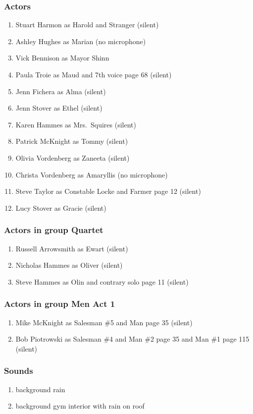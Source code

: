 \subsubsection{Actors}
\begin{enumerate}
\item Stuart Harmon as Harold and Stranger (silent)
\item Ashley Hughes as Marian (no microphone)
\item Vick Bennison as Mayor Shinn
\item Paula Troie as Maud and 7th voice page 68 (silent)
\item Jenn Fichera as Alma (silent)
\item Jenn Stover as Ethel (silent)
\item Karen Hammes as Mrs.~Squires (silent)
\item Patrick McKnight as Tommy (silent)
\item Olivia Vordenberg as Zaneeta (silent)
\item Christa Vordenberg as Amaryllis (no microphone)
\item Steve Taylor as Constable Locke and Farmer page 12 (silent)
\item Lucy Stover as Gracie (silent)
\end{enumerate}
\subsubsection{Actors in group Quartet}
\begin{enumerate}
\item Russell Arrowsmith as Ewart (silent)
\item Nicholas Hammes as Oliver (silent)
\item Steve Hammes as Olin and contrary solo page 11 (silent)
\end{enumerate}
\subsubsection{Actors in group Men Act 1}
\begin{enumerate}
\item Mike McKnight as Salesman \#5 and Man page 35 (silent)
\item Bob Piotrowski as Salesman \#4 and Man \#2 page 35 and Man \#1 page 115 (silent)
\end{enumerate}

\subsubsection{Sounds}
\begin{enumerate}
\item background rain
\item background gym interior with rain on roof
\end{enumerate}
